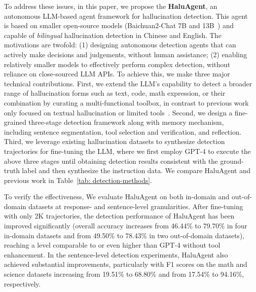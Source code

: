 To address these issues, in this paper, we propose the \textbf{HaluAgent}, an autonomous LLM-based agent framework for hallucination detection. This agent is based on smaller open-source models (\ie Baichuan2-Chat 7B and 13B~\cite{yang2023baichuan}) and capable of \emph{bilingual} hallucination detection in Chinese and English. The motivations are twofold: (1) designing autonomous detection agents that can actively make decisions and judgements, without human
assistance; (2) enabling relatively smaller models to effectively perform complex detection, without reliance on close-sourced LLM APIs. To achieve this, we make three major technical contributions. First, we extend the LLM's capability to detect a broader range of hallucination forms such as text, code, math expression, or their combination by curating a multi-functional toolbox, in contrast to previous work only focused on textual hallucination or limited tools~\cite{manakul2023selfcheckgpt,min2023factscore}. Second, we design a fine-grained three-stage detection framework along with memory mechanism, including sentence segmentation, tool selection and verification, and reflection. Third, we leverage existing hallucination datasets to synthesize detection trajectories for fine-tuning the LLM, where we first employ GPT-4 to execute the above three stages until obtaining detection results consistent with the ground-truth label and then synthesize the instruction data. We compare HaluAgent and previous work in Table~\ref{tab: detection-methods}.

To verify the effectiveness, We evaluate HaluAgent on both in-domain and out-of-domain datasets at response- and sentence-level granularities. After fine-tuning with only 2K trajectories, the detection performance of HaluAgent has been improved significantly (\eg overall accuracy increases from 46.44\% to 79.70\% in four in-domain datasets and from 49.50\% to 78.43\% in two out-of-domain datasets), reaching a level comparable to or even higher than GPT-4 without tool enhancement. In the sentence-level detection experiments, HaluAgent also achieved substantial improvements, particularly with F1 scores on the math and science datasets increasing from 19.51\% to 68.80\% and from 17.54\% to 94.16\%, respectively.




